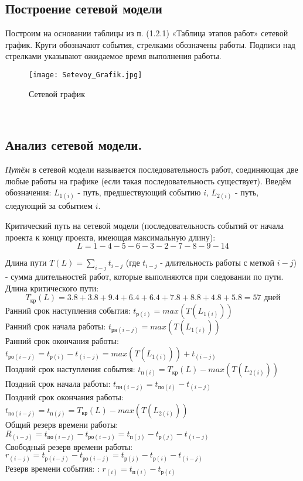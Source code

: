 
\newpage

\subsection{Построение сетевой модели}

Построим на основании таблицы из п. (1.2.1) «Таблица этапов работ» сетевой график. Круги обозначают события, стрелками обозначены работы. Подписи над стрелками указывают ожидаемое время выполнения работы.
\\
\begin{figure}[ht!]
\label{setgr}
\centering \texttt{[image: Setevoy\_Grafik.jpg]}
\caption{Сетевой график}
\end{figure}
\\
\subsection{Анализ сетевой модели.}

{\itshape Путём} в сетевой модели называется последовательность работ, соединя\-ющая две любые работы на графике (если такая последовательность сущест\-вует).
Введём обозначения: $L_{1(i)}$ - путь, предшествующий событию $i$, $L_{2(i)}$ - путь, следующий за событием $i$.

Критический путь на сетевой модели (последовательность событий от начала проекта к концу проекта, имеющая максимальную длину):
$$
L = 1-4-5-6-3-2-7-8-9-14
$$

Длина пути $T(L) = \sum\limits_{i-j}t_{i-j}$ (где $t_{i-j}$ - длительность работы с меткой $i-j$) - сумма длительностей работ, которые выполняются при следовании по пути. Длина критического пути:
$$
T_{\mbox{кр}}(L) = 3.8+3.8+9.4+6.4+6.4+7.8+8.8+4.8+5.8 = 57 \mbox{ дней}
$$
Ранний срок наступления события: $t_{\mbox{р}(i)} = max(T(L_{1(i)}))$\\
Ранний срок начала работы: $t_{\mbox{рн}(i-j)} = max(T(L_{1(i)}))$\\
Ранний срок окончания работы: $t_{\mbox{ро}(i-j)}= t_{\mbox{р}(i)} - t_{(i-j)} = max(T(L_{1(i)})) + t_{(i-j)} $\\
Поздний срок наступления события: $t_{\mbox{п}(i)}= T_{\mbox{кр}}(L) -  max(T(L_{2(i)}))$\\
Поздний срок начала работы: $t_{\mbox{пн}(i-j)}= t_{\mbox{по}(i)} - t_{(i-j)}$\\
Поздний срок окончания работы: $t_{\mbox{по}(i-j)} = t_{\mbox{п}(j)}= T_{\mbox{кр}}(L) -  max(T(L_{2(i)}))$\\
Общий резерв времени работы: $R_{(i-j)} = t_{\mbox{по}(i-j)} - t_{\mbox{ро}(i-j)} =  t_{\mbox{п}(j)} -  t_{\mbox{р}(j)} -  t_{(i-j)}$\\
Свободный резерв времени работы: $r_{(i-j)} = t_{\mbox{р}(i-j)} - t_{\mbox{ро}(i-j)} =  t_{\mbox{р}(j)} -  t_{\mbox{р}(i)} -  t_{(i-j)}$\\
Резерв времени события: : $r_{(i)} = t_{\mbox{п}(i)} - t_{\mbox{р}(i)} $

